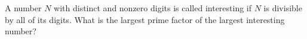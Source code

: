 A number $N$ with distinct and nonzero digits is called interesting if $N$ is divisible by all of its digits. What is the largest prime factor of the largest interesting number?

